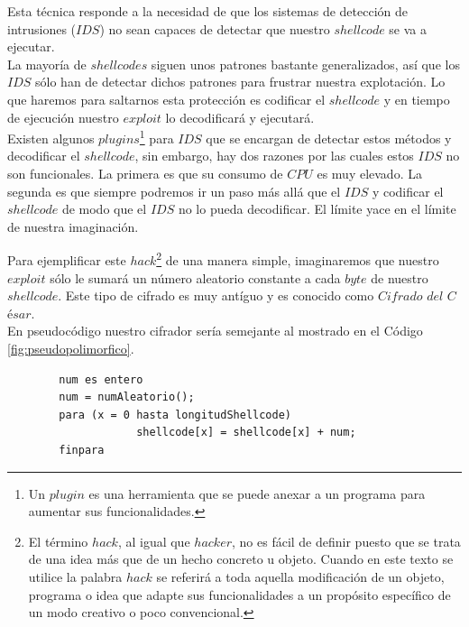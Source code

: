 \documentclass [titlepage, 12pt]{article}
\newcommand{\topfigrule}{\hrule\vspace{4 pt}}
\newcommand{\botfigrule}{\hrule\vspace{4 pt}}
\begin{document}
Esta t\'ecnica responde a la necesidad de que los sistemas de detecci\'on de intrusiones ($IDS$) no sean capaces de detectar que nuestro $shellcode$ se va a ejecutar.\\
La mayor\'ia de $shellcodes$ siguen unos patrones bastante generalizados, as\'i que los $IDS$ s\'olo han de detectar dichos patrones para frustrar nuestra explotaci\'on. Lo que haremos para saltarnos esta protecci\'on es codificar el $shellcode$ y en tiempo de ejecuci\'on nuestro $exploit$ lo decodificar\'a y ejecutar\'a.\\
Existen algunos $plugins$\footnote{Un $plugin$ es una herramienta que se puede anexar a un programa para aumentar sus funcionalidades.} para $IDS$ que se encargan de detectar estos m\'etodos y decodificar el $shellcode$, sin embargo, hay dos razones por las cuales estos $IDS$ no son funcionales. La primera es que su consumo de $CPU$ es muy elevado. La segunda es que siempre podremos ir un paso m\'as all\'a que el $IDS$ y codificar el $shellcode$ de modo que el $IDS$ no lo pueda decodificar. El l\'imite yace en el l\'imite de nuestra imaginaci\'on.\bigskip

Para ejemplificar este $hack$\footnote{El t\'ermino $hack$, al igual que $hacker$, no es f\'acil de definir puesto que se trata de una idea m\'as que de un hecho concreto u objeto. Cuando en este texto se utilice la palabra $hack$ se referir\'a a toda aquella modificaci\'on de un objeto, programa o idea que adapte sus funcionalidades a un prop\'osito espec\'ifico de un modo creativo o poco convencional.} de una manera simple, imaginaremos que nuestro $exploit$ s\'olo le sumar\'a un n\'umero aleatorio constante a cada $byte$ de nuestro $shellcode$. Este tipo de cifrado es muy ant\'iguo y es conocido como $Cifrado$ $del$ $C$\'e$sar$.\\
En pseudoc\'odigo nuestro cifrador ser\'ia semejante al mostrado en el C\'odigo \ref{fig:pseudopolimorfico}.\\

\lstset{language=C++,caption=Pseudoc\'odigo del cifrador,label=fig:pseudopolimorfico}
\begin{lstlisting}				
		num es entero
		num = numAleatorio();
		para (x = 0 hasta longitudShellcode) 
					shellcode[x] = shellcode[x] + num;
		finpara
\end{lstlisting}
\end{document}
